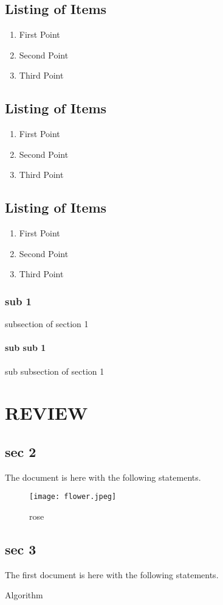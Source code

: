 \documentclass[12pt]{report}
\begin{document}
\section{Listing of Items}
\begin{enumerate}[label=\roman*]
\item First Point
\item Second Point
\item Third Point
\end{enumerate}

\section{Listing of Items}
\begin{enumerate}[label=\Roman*]
\item First Point
\item Second Point
\item Third Point
\end{enumerate}

\section{Listing of Items}
\begin{enumerate}[label=\Alph*]
\item First Point
\item Second Point
\item Third Point
\end{enumerate}
\subsection{ sub 1}
subsection of section 1
\subsubsection{sub sub 1}
sub subsection of section 1
\chapter{REVIEW}
\section{sec 2}
The document is here with the following statements. 

\begin{figure}[H]
\centering
\texttt{[image: flower.jpeg]}
\caption{rose}
\end{figure}
\section{sec 3}The first document is here with the following statements. 

\begin{algorithm}[H]
\caption{Algorithm}
\end{algorithm}
\end{document}
